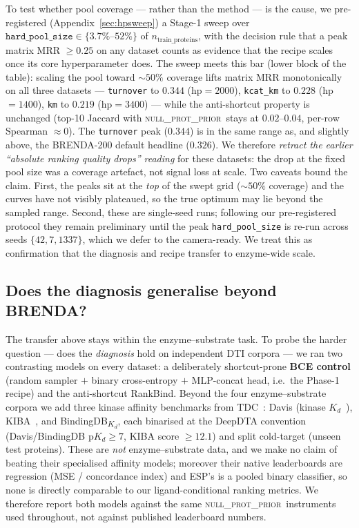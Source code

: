 \documentclass[11pt,a4paper]{article}
\newcommand{\method}{RankBind\xspace}
\newcommand{\nullprior}{\textsc{null\_prot\_prior}\xspace}
\begin{document}
To test whether pool coverage --- rather than the method --- is the
cause, we pre-registered (Appendix~\ref{sec:hpsweep}) a Stage-1 sweep
over $\texttt{hard\_pool\_size} \in \{3.7\%\text{--}52\%\}$ of
$n_{\text{train\_proteins}}$, with the decision rule that a peak matrix
MRR $\ge 0.25$ on any dataset counts as evidence that the recipe scales
once its core hyperparameter does. The sweep meets this bar (lower
block of the table): scaling the pool toward $\sim\!50\%$ coverage
lifts matrix MRR monotonically on all three datasets --- \texttt{turnover}
to $\mathbf{0.344}$ (hp$=2000$), \texttt{kcat\_km} to $\mathbf{0.228}$
(hp$=1400$), \texttt{km} to $\mathbf{0.219}$ (hp$=3400$) --- while the
anti-shortcut property is unchanged (top-10 Jaccard with \nullprior\
stays at $0.02$--$0.04$, per-row Spearman $\approx 0$). The
\texttt{turnover} peak ($0.344$) is in the same range as, and slightly
above, the BRENDA-200 default headline ($0.326$). We therefore
\emph{retract the earlier ``absolute ranking quality drops'' reading}
for these datasets: the drop at the fixed pool size was a
coverage artefact, not signal loss at scale. Two caveats bound the
claim. First, the peaks sit at the \emph{top} of the swept grid
($\sim\!50\%$ coverage) and the curves have not visibly plateaued, so
the true optimum may lie beyond the sampled range. Second, these are
single-seed runs; following our pre-registered protocol they remain
preliminary until the peak \texttt{hard\_pool\_size} is re-run across
seeds $\{42, 7, 1337\}$, which we defer to the camera-ready. We treat
this as confirmation that the diagnosis and recipe transfer to
enzyme-wide scale.

\subsection{Does the diagnosis generalise beyond BRENDA?}
\label{sec:generalise}

The transfer above stays within the enzyme--substrate task. To probe
the harder question --- does the \emph{diagnosis} hold on independent
DTI corpora --- we ran two contrasting models on every dataset: a
deliberately shortcut-prone \textbf{BCE control} (random sampler $+$
binary cross-entropy $+$ MLP-concat head, i.e.\ the Phase-1 recipe) and
the anti-shortcut \method. Beyond the four enzyme--substrate corpora we
add three kinase affinity benchmarks from TDC~\citep{huang2021tdc}:
Davis (kinase $K_d$~\citep{davis2011kinase}),
KIBA~\citep{tang2014kiba}, and BindingDB\textsubscript{$K_d$}, each
binarised at the DeepDTA convention~\citep{ozturk2018deepdta}
(Davis/BindingDB $\text{p}K_d \ge 7$, KIBA score $\ge 12.1$) and split
cold-target (unseen test proteins). These are \emph{not}
enzyme--substrate data, and we make no claim of beating their
specialised affinity models; moreover their native leaderboards are
regression (MSE / concordance index) and ESP's is a pooled binary
classifier, so none is directly comparable to our ligand-conditional
ranking metrics. We therefore report both models against the same
\nullprior\ instruments used throughout, not against published
leaderboard numbers.
\end{document}
